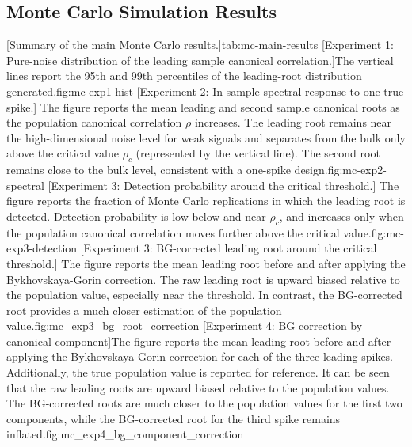 \documentclass[12pt]{report} %
\begin{document}
\subsection*{Monte Carlo Simulation Results}
[Summary of the main Monte Carlo results.]{}{tab:mc-main-results}
[Experiment 1: Pure-noise distribution of the leading sample 
canonical correlation.]{The vertical lines report the 95th and 99th percentiles of the 
leading-root distribution generated.}{fig:mc-exp1-hist}
[Experiment 2: In-sample spectral response to one true spike.]{
The figure reports the mean leading and second sample canonical roots as the population canonical correlation \(\rho\) increases. 
The leading root remains near the high-dimensional noise level for weak signals and separates from the bulk only above the 
critical value \(\rho_c\) (represented by the vertical line). The second root remains close to the bulk level, consistent 
with a one-spike design.}{fig:mc-exp2-spectral}
[Experiment 3: Detection probability around the critical threshold.]{
The figure reports the fraction of Monte Carlo replications in which the leading root is detected. 
Detection probability is low below and near \(\rho_c\), and increases only when the population canonical 
correlation moves further above the critical value.}{fig:mc-exp3-detection}
[Experiment 3: BG-corrected leading root around the critical threshold.]
{The figure reports the mean leading root before and after applying the Bykhovskaya-Gorin correction. 
The raw leading root is upward biased relative to the population value, especially near the threshold.
In contrast, the BG-corrected root provides a much closer estimation of the population value.}{fig:mc_exp3_bg_root_correction}
[Experiment 4: BG correction by canonical component]{The figure
reports the mean leading root before and after applying the Bykhovskaya-Gorin correction for each of the three leading spikes.
Additionally, the true population value is reported for reference. It can be seen that the raw leading roots are 
upward biased relative to the population values. The BG-corrected roots are much closer to the population 
values for the first two components, while the BG-corrected root for the third spike remains inflated.}{fig:mc_exp4_bg_component_correction}
\end{document}
